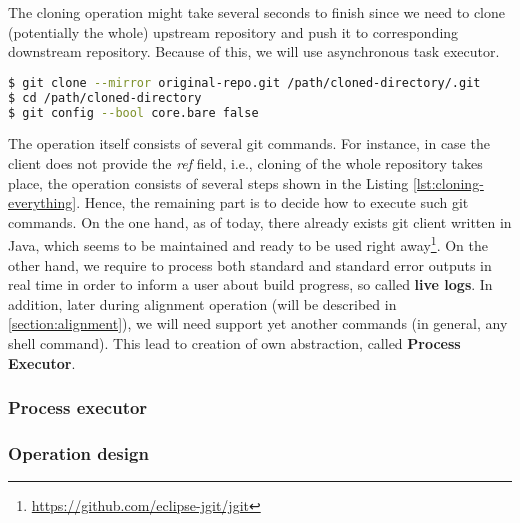 \documentclass[../main.tex]{subfiles}
\begin{document}
The cloning operation might take several seconds to finish since we need to clone (potentially the whole) upstream repository and push it to corresponding downstream repository. Because of this, we will use asynchronous task executor.

\begin{lstlisting}[numbers=none, language=bash, label={lst:cloning-everything}, caption=Cloning the whole repository]
$ git clone --mirror original-repo.git /path/cloned-directory/.git
$ cd /path/cloned-directory
$ git config --bool core.bare false
\end{lstlisting}

The operation itself consists of several git commands. For instance, in case the client does not provide the \textit{ref} field, i.e., cloning of the whole repository takes place, the operation consists of several steps\cite{gitfaq} shown in the Listing \ref{lst:cloning-everything}. Hence, the remaining part is to decide how to execute such git commands. On the one hand, as of today, there already exists git client written in Java, which seems to be maintained and ready to be used right away\footnote{\url{https://github.com/eclipse-jgit/jgit}}. On the other hand, we require to process both standard and standard error outputs in real time in order to inform a user about build progress, so called \textbf{live logs}. In addition, later during alignment operation (will be described in \ref{section:alignment}), we will need support yet another commands (in general, any shell command). This lead to creation of own abstraction, called \textbf{Process Executor}.

\subsubsection*{Process executor}
\label{subsubsec:process-executor}


\subsubsection*{Operation design}

\end{document}
